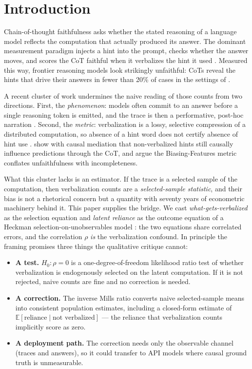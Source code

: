 \documentclass[10pt]{article}
\newcommand{\E}{\mathbb{E}}
\begin{document}
\section{Introduction}
\label{sec:intro}

Chain-of-thought faithfulness asks whether the stated reasoning of a
language model reflects the computation that actually produced its answer.
The dominant measurement paradigm injects a hint into the prompt, checks
whether the answer moves, and scores the CoT faithful when it verbalizes the
hint it used \citep{turpin2023,lanham2023,chen2025reasoning}. Measured this
way, frontier reasoning models look strikingly unfaithful: CoTs reveal the
hints that drive their answers in fewer than 20\% of cases in the settings
of \citet{chen2025reasoning}.

A recent cluster of work undermines the naive reading of those counts from
two directions. First, the \emph{phenomenon}: models often commit to an
answer before a single reasoning token is emitted, and the trace is then a
performative, post-hoc narration
\citep{performative2026,commitment2026,rationalization2026}. Second, the
\emph{metric}: verbalization is a lossy, selective compression of a
distributed computation, so absence of a hint word does not certify absence
of hint use \citep{zaman2025,young2026measuring}. \citet{zaman2025} show
with causal mediation that non-verbalized hints still causally influence
predictions through the CoT, and argue the Biasing-Features metric conflates
unfaithfulness with incompleteness.

What this cluster lacks is an estimator. If the trace is a selected sample
of the computation, then verbalization counts are a \emph{selected-sample
statistic}, and their bias is not a rhetorical concern but a quantity with
seventy years of econometric machinery behind it. This paper supplies the
bridge. We cast \emph{what-gets-verbalized} as the selection equation and
\emph{latent reliance} as the outcome equation of a Heckman
selection-on-unobservables model \citep{heckman1979}: the two equations
share correlated errors, and the correlation $\rho$ \emph{is} the
verbalization confound. In principle the framing promises three things the
qualitative critique cannot:

\begin{itemize}
\item \textbf{A test.} $H_0\!:\rho=0$ is a one-degree-of-freedom likelihood
ratio test of whether verbalization is endogenously selected on the latent
computation. If it is not rejected, naive counts are fine and no correction
is needed.
\item \textbf{A correction.} The inverse Mills ratio converts naive
selected-sample means into consistent population estimates, including a
closed-form estimate of $\E[\text{reliance}\mid\text{not verbalized}]$ ---
the reliance that verbalization counts implicitly score as zero.
\item \textbf{A deployment path.} The correction needs only the observable
channel (traces and answers), so it could transfer to API models where causal
ground truth is unmeasurable.
\end{itemize}
\end{document}
